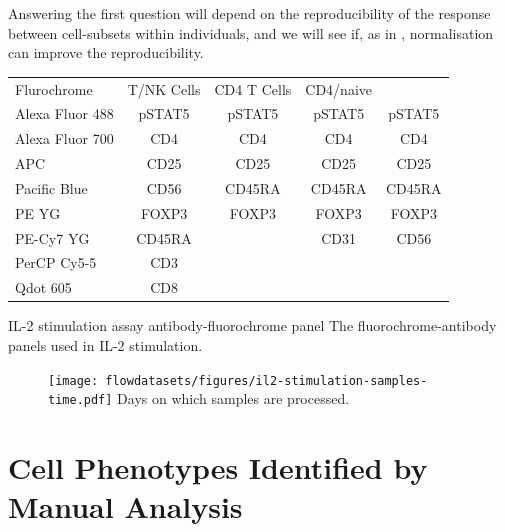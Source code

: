 Answering the first question will depend on the reproducibility of the response between cell-subsets within individuals,
and we will see if, as in , normalisation can improve the reproducibility.




\begin{table}[h!]\footnotesize
  \centering
\begin{tabularx}{\textwidth}{lcccc}
\rowcolor{Gray}
Flurochrome     & T/NK Cells & CD4 T Cells & CD4/naive \\
Alexa Fluor 488 & pSTAT5 & pSTAT5 & pSTAT5 & pSTAT5  \\
Alexa Fluor 700 & CD4    & CD4    & CD4    & CD4     \\
APC             & CD25   & CD25   & CD25   & CD25    \\
Pacific Blue    & CD56   & CD45RA & CD45RA & CD45RA  \\
PE YG           & FOXP3  & FOXP3  & FOXP3  & FOXP3   \\
PE-Cy7 YG       & CD45RA &        & CD31   & CD56    \\
PerCP Cy5-5     & CD3    &        &        &         \\
Qdot 605        & CD8    &        &        &         \\
\end{tabularx}
{IL-2 stimulation assay antibody-fluorochrome panel}
{
The fluorochrome-antibody panels used in IL-2 stimulation.
}
\end{table}

\begin{figure}
\centering
\texttt{[image: flowdatasets/figures/il2-stimulation-samples-time.pdf]}
{ Days on which samples are processed. }
{
}
\end{figure}


\section{Cell Phenotypes Identified by Manual Analysis}


